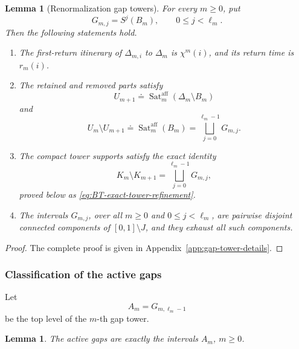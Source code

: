 \documentclass[11pt]{amsart}
\theoremstyle{plain}
\newtheorem{lemma}[theorem]{Lemma}
\theoremstyle{definition}
\theoremstyle{remark}
\begin{document}
\begin{lemma}[Renormalization gap towers]
\label{lem:BT-gap-towers}
For every \(m\geq0\), put
\[
        G_{m,j}=S^j(B_m),
        \qquad
        0\leq j<\ell_m.
\tag{8.20}
\label{eq:BT-gap-towers}
\]
Then the following statements hold.
\begin{enumerate}[label=\textup{(\roman*)}]
\item The first-return itinerary of \(\Delta_{m,i}\) to \(\Delta_m\) is
\(\chi^m(i)\), and its return time is \(r_m(i)\).

\item The retained and removed parts satisfy
\[
        U_{m+1}
        \doteq
        \operatorname{Sat}^{\mathrm{aff}}_m(\Delta_m\setminus B_m)
\]
and
\[
        U_m\setminus U_{m+1}
        \doteq
        \operatorname{Sat}^{\mathrm{aff}}_m(B_m)
        =
        \bigsqcup_{j=0}^{\ell_m-1}G_{m,j}.
\]

\item The compact tower supports satisfy the exact identity
\[
        K_m\setminus K_{m+1}
        =
        \bigsqcup_{j=0}^{\ell_m-1}G_{m,j},
\]
proved below as \eqref{eq:BT-exact-tower-refinement}.

\item The intervals \(G_{m,j}\), over all \(m\geq0\) and
\(0\leq j<\ell_m\), are pairwise disjoint connected components of
\([0,1]\setminus J\), and they exhaust all such components.
\end{enumerate}
\end{lemma}

\begin{proof}
The complete proof is given in Appendix~\ref{app:gap-tower-details}.
\end{proof}

\subsubsection{Classification of the active gaps}

Let
\[
        A_m=G_{m,\ell_m-1}
\tag{8.21}
\label{eq:BT-top-gap}
\]
be the top level of the \(m\)-th gap tower.

\begin{lemma}
\label{lem:BT-active-gaps}
The active gaps are exactly the intervals \(A_m\), \(m\geq0\).
\end{lemma}
\end{document}
